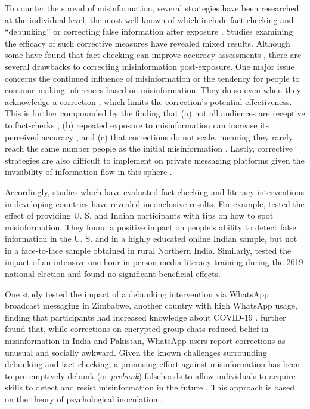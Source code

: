 \documentclass[empirical, authordate, issue]{jote-new-article}
\begin{document}
To counter the spread of misinformation, several strategies have been researched at the individual level, the most well-known of which include fact-checking and “debunking” or correcting false information after exposure \parencite{Ecker2022, vanderLinden2022, Walter2018}. Studies examining the efficacy of such corrective measures have revealed mixed results. Although some have found that fact-checking can improve accuracy assessments \parencite{Clayton2020, Porter2021, Walter2018}, there are several drawbacks to correcting misinformation post-exposure. One major issue concerns the continued influence of misinformation or the tendency for people to continue making inferences based on misinformation. They do so even when they acknowledge a correction \parencite{Ecker2022, Lewandowsky2012}, which limits the correction's potential effectiveness. This is further compounded by the finding that (a) not all audiences are receptive to fact-checks \parencite{Walter2020}, (b) repeated exposure to misinformation can increase its perceived accuracy \parencite{Pennycook2018, Swire2017}, and (c) that corrections do not scale, meaning they rarely reach the same number people as the initial misinformation \parencite{Roozenbeek2019, vanderLinden2022}. Lastly, corrective strategies are also difficult to implement on private messaging platforms given the invisibility of information flow in this sphere \parencite{Reis2020}.

Accordingly, studies which have evaluated fact-checking and literacy interventions in developing countries have revealed inconclusive results. For example, \textcite{Guess2020} tested the effect of providing U. S. and Indian participants with tips on how to spot misinformation. They found a positive impact on people's ability to detect false information in the U. S. and in a highly educated online Indian sample, but not in a face-to-face sample obtained in rural Northern India. Similarly, \textcite{Badrinathan2021} tested the impact of an intensive one-hour in-person media literacy training during the 2019 national election and found no significant beneficial effects.

One study tested the impact of a debunking intervention via \mbox{WhatsApp} broadcast messaging in Zimbabwe, another country with high \mbox{WhatsApp} usage, finding that participants had increased knowledge about COVID-19 \parencite{Bowles2020}. \textcite{Pasquetto2020} further found that, while corrections on encrypted group chats reduced belief in misinformation in India and Pakistan, \mbox{WhatsApp} users report corrections as unusual and socially awkward. Given the known challenges surrounding debunking and fact-checking, a promising effort against misinformation has been to pre-emptively debunk (or \emph{prebunk}) falsehoods to allow individuals to acquire skills to detect and resist misinformation in the future \parencite{Lewandowsky2021}. This approach is based on the theory of psychological inoculation \parencite{McGuire1961}.
\end{document}
